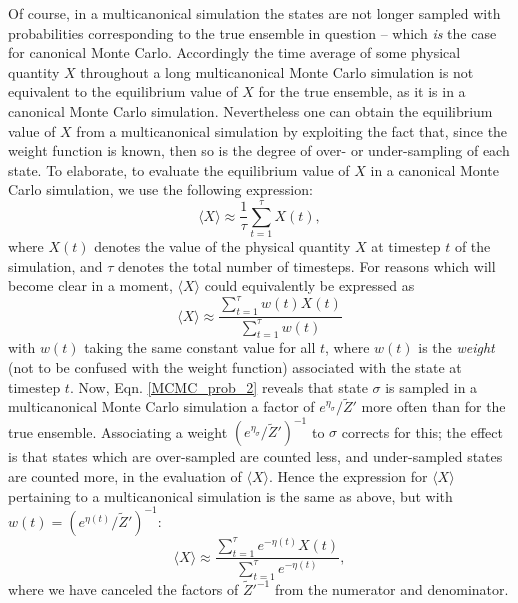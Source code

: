 \documentclass{report}
\begin{document}
Of course, in a multicanonical simulation the states are not longer sampled with probabilities corresponding to the true ensemble in question -- 
which \emph{is} the case for canonical Monte Carlo. Accordingly the time average of some physical quantity $X$ throughout a long multicanonical 
Monte Carlo simulation is not equivalent to the equilibrium value of $X$ for the true ensemble, as it is in a canonical Monte Carlo
simulation. Nevertheless one can obtain the equilibrium value of $X$ from a multicanonical simulation by exploiting the fact that, since the 
weight function is known, then so is the degree of over- or under-sampling of each state. To elaborate, to evaluate the equilibrium value of 
$X$ in a canonical Monte Carlo simulation, we use the following expression:
\begin{equation}
\langle X\rangle\approx\frac{1}{\tau}\sum_{t=1}^{\tau}X(t),
\end{equation}
where $X(t)$ denotes the value of the physical quantity $X$ at timestep $t$ of the simulation, and $\tau$ denotes the total number of timesteps.
For reasons which will become clear in a moment, $\langle X\rangle$ could equivalently be expressed as
\begin{equation}
\langle X\rangle\approx\frac{\displaystyle\sum_{t=1}^{\tau}w(t)X(t)}{\displaystyle\sum_{t=1}^{\tau}w(t)}
\end{equation}
with $w(t)$ taking the same constant value for all $t$, where $w(t)$ is the \emph{weight} (not to be confused with the weight function) associated 
with the state at timestep $t$.
Now, Eqn. \eqref{MCMC_prob_2} reveals that state $\sigma$ is sampled in a multicanonical Monte Carlo simulation a factor of
$e^{\eta_{\sigma}}/\tilde{Z}'$ more often than for the true ensemble. Associating a weight $(e^{\eta_{\sigma}}/\tilde{Z}')^{-1}$ to $\sigma$ corrects for
this; the effect is that states which are over-sampled are counted less, and under-sampled states are counted more, in the evaluation of $\langle X\rangle$.
Hence the expression for $\langle X\rangle$ pertaining to a multicanonical simulation is the same as above, but with $w(t)=(e^{\eta(t)}/\tilde{Z}')^{-1}$:
\begin{equation}\label{equilX_MCMC}
\langle X\rangle\approx\frac{\displaystyle\sum_{t=1}^{\tau}e^{-\eta(t)}X(t)}{\displaystyle\sum_{t=1}^{\tau}e^{-\eta(t)}},
\end{equation}
where we have canceled the factors of $\tilde{Z}'^{-1}$ from the numerator and denominator.
\end{document}
